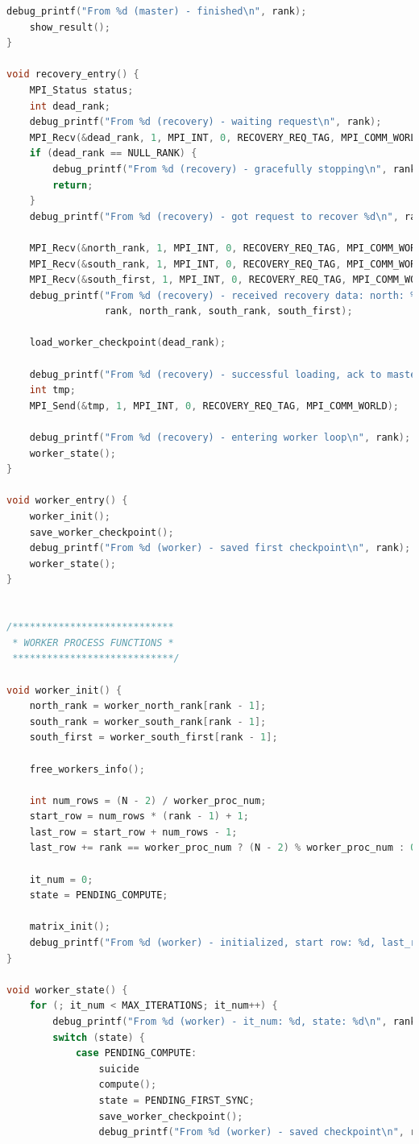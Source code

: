 \documentclass[a4paper]{article}
\begin{document}
\begin{lstlisting}[caption=jac\_3d\_mpi\_ft.c, label={lst:2}, language=C]
    debug_printf("From %d (master) - finished\n", rank);
    show_result();
}

void recovery_entry() {
    MPI_Status status;
    int dead_rank;
    debug_printf("From %d (recovery) - waiting request\n", rank);
    MPI_Recv(&dead_rank, 1, MPI_INT, 0, RECOVERY_REQ_TAG, MPI_COMM_WORLD, &status);
    if (dead_rank == NULL_RANK) {
        debug_printf("From %d (recovery) - gracefully stopping\n", rank);
        return;
    }
    debug_printf("From %d (recovery) - got request to recover %d\n", rank, dead_rank);

    MPI_Recv(&north_rank, 1, MPI_INT, 0, RECOVERY_REQ_TAG, MPI_COMM_WORLD, &status);
    MPI_Recv(&south_rank, 1, MPI_INT, 0, RECOVERY_REQ_TAG, MPI_COMM_WORLD, &status);
    MPI_Recv(&south_first, 1, MPI_INT, 0, RECOVERY_REQ_TAG, MPI_COMM_WORLD, &status);
    debug_printf("From %d (recovery) - received recovery data: north: %d, south: %d, south first: %d\n",
                 rank, north_rank, south_rank, south_first);

    load_worker_checkpoint(dead_rank);

    debug_printf("From %d (recovery) - successful loading, ack to master\n", rank);
    int tmp;
    MPI_Send(&tmp, 1, MPI_INT, 0, RECOVERY_REQ_TAG, MPI_COMM_WORLD);

    debug_printf("From %d (recovery) - entering worker loop\n", rank);
    worker_state();
}

void worker_entry() {
    worker_init();
    save_worker_checkpoint();
    debug_printf("From %d (worker) - saved first checkpoint\n", rank);
    worker_state();
}


/****************************
 * WORKER PROCESS FUNCTIONS *
 ****************************/

void worker_init() {
    north_rank = worker_north_rank[rank - 1];
    south_rank = worker_south_rank[rank - 1];
    south_first = worker_south_first[rank - 1];

    free_workers_info();

    int num_rows = (N - 2) / worker_proc_num;
    start_row = num_rows * (rank - 1) + 1;
    last_row = start_row + num_rows - 1;
    last_row += rank == worker_proc_num ? (N - 2) % worker_proc_num : 0;

    it_num = 0;
    state = PENDING_COMPUTE;

    matrix_init();
    debug_printf("From %d (worker) - initialized, start row: %d, last_row: %d\n", rank, start_row, last_row);
}

void worker_state() {
    for (; it_num < MAX_ITERATIONS; it_num++) {
        debug_printf("From %d (worker) - it_num: %d, state: %d\n", rank, it_num, state);
        switch (state) {
            case PENDING_COMPUTE:
                suicide
                compute();
                state = PENDING_FIRST_SYNC;
                save_worker_checkpoint();
                debug_printf("From %d (worker) - saved checkpoint\n", rank);


\end{lstlisting}
\end{document}

